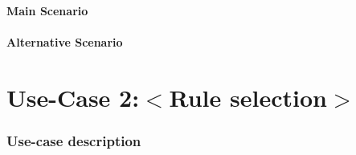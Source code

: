 \documentclass[notitlepage]{article}
\begin{document}
\subsection{Main Scenario}\label{subsec:main:scenario}

\begin{comment}
	\begin{itemize}
  		\item Frame collection is created based on rule selection.
  		\item Frame got updated after each iterations.
  		\item Canvas and app got updated after receive message from frame collection.
  		\item Iteration count reach limit.
  		\item Simulation end.
  		\item Pop up window show the summary.
	\end{itemize}
\end{comment}

\subsection{Alternative Scenario}\label{subsec:alternative:scenario}

\begin{comment}
	\begin{itemize}
  		\item window is deactivated. Simulation will be paused automatically.
  		\item Pause button is pressed. Simulation will be paused.
  		\item Stop button is clicked. Simulation will be terminated early.
  		\item Pop up window show the summary.
	\end{itemize}
\end{comment}
\pagebreak


\part{\LARGE Use-Case 2:$<$Rule selection$>$}

\section{Use-case description}
\end{document}
